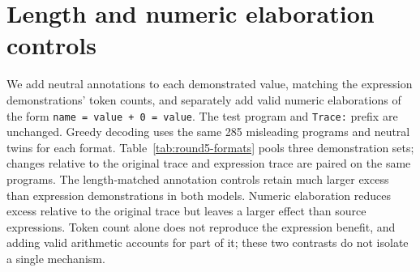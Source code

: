 \section{Length and numeric elaboration controls}
\label{app:round5-formats}
We add neutral annotations to each demonstrated value, matching the expression demonstrations' token counts, and separately add valid numeric elaborations of the form \texttt{name = value + 0 = value}. The test program and \texttt{Trace:} prefix are unchanged. Greedy decoding uses the same 285 misleading programs and neutral twins for each format. Table~\ref{tab:round5-formats} pools three demonstration sets; changes relative to the original trace and expression trace are paired on the same programs.
The length-matched annotation controls retain much larger excess than expression demonstrations in both models. Numeric elaboration reduces excess relative to the original trace but leaves a larger effect than source expressions. Token count alone does not reproduce the expression benefit, and adding valid arithmetic accounts for part of it; these two contrasts do not isolate a single mechanism.
\begin{table}[t]
\centering\small
{}
\ifdim\wd\roundfivebox>\textwidth\resizebox{\textwidth}{!}{\usebox{\roundfivebox}}\else\usebox{\roundfivebox}\fi
\caption{Excess name errors and paired changes in percentage points [95\% interval]. Bootstrap clusters keep all demonstration repeats for each matched program together. These controls assess length and numeric elaboration; they do not by themselves establish how expressions change generation.}
\label{tab:round5-formats}
\end{table}
